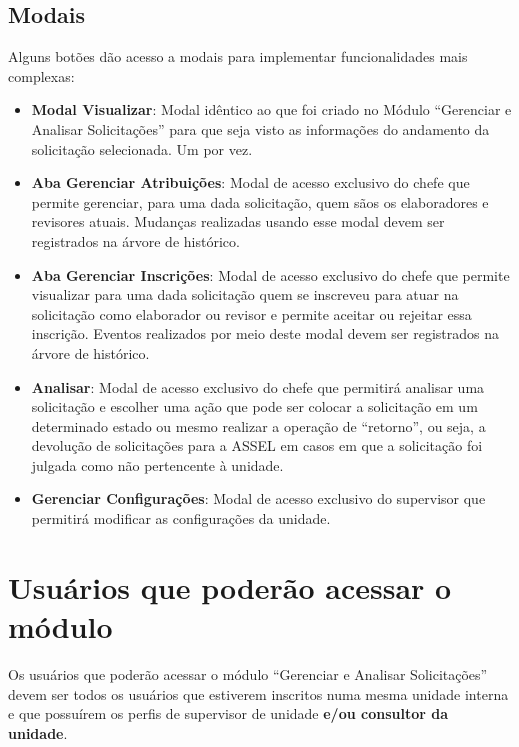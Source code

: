 	\subsection{Modais}

	Alguns botões dão acesso a modais para implementar funcionalidades mais complexas: 
	
	\begin{itemize}
		\item \textbf{Modal Visualizar}: Modal idêntico ao que foi criado no Módulo ``Gerenciar e Analisar Solicitações'' para que seja visto as informações do andamento da solicitação selecionada. Um por vez. 
		
		\item \textbf{Aba Gerenciar Atribuições}: Modal de acesso exclusivo do chefe que permite gerenciar, para uma dada solicitação, quem sãos os elaboradores e revisores atuais. Mudanças realizadas usando esse modal devem ser registrados na árvore de histórico.
		
		\item \textbf{Aba Gerenciar Inscrições}: Modal de acesso exclusivo do chefe que permite visualizar para uma dada solicitação quem se inscreveu para atuar na solicitação como elaborador ou revisor e permite aceitar ou rejeitar essa inscrição.  Eventos realizados por meio deste modal devem ser registrados na árvore de histórico.		

		\item \textbf{Analisar}: Modal de acesso exclusivo do chefe que permitirá analisar uma solicitação e escolher uma ação que pode ser colocar a solicitação em um determinado estado ou mesmo realizar a operação de ``retorno'', ou seja, a devolução de solicitações para a ASSEL em casos em que a solicitação foi julgada como não pertencente à unidade. 
		
		\item \textbf{Gerenciar Configurações}: Modal de acesso exclusivo do supervisor que permitirá modificar as configurações da unidade.
	
	\end{itemize}


\section{Usuários que poderão acessar o módulo}

Os usuários que poderão acessar o módulo ``Gerenciar e Analisar Solicitações'' devem ser todos os usuários que estiverem inscritos numa mesma unidade interna e que possuírem os perfis de supervisor de unidade \hypertarget{data230823mudanca2}{\textbf{e/ou consultor da unidade}}. 


